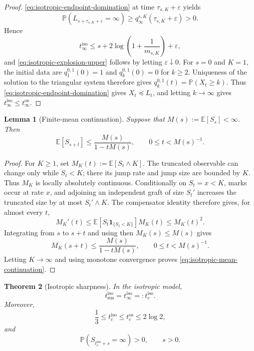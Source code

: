 \documentclass[11pt,a4paper]{amsart}
\newtheorem{theorem}{Theorem}[section]
\newtheorem{lemma}[theorem]{Lemma}
\theoremstyle{remark}
\begin{document}
\begin{proof}
\eqref{eq:isotropic-endpoint-domination} at time
$\tau_{s,K}+\varepsilon$ yields
\[
\mathbb P
(L_{s+\tau_{s,K}+\varepsilon}=\infty)
\geq
q_\infty^{s,K}(\tau_{s,K}+\varepsilon)>0.
\]
Hence
\[
t_{\infty}^{\mathrm{iso}}
\leq
s+2\log\left(1+\frac1{m_{s,K}}\right)+\varepsilon,
\]
and \eqref{eq:isotropic-explosion-upper} follows by letting
$\varepsilon\downarrow0$.
For $s=0$ and $K=1$, the initial data are
$q_1^{0,1}(0)=1$ and $q_k^{0,1}(0)=0$ for $k\geq2$. Uniqueness of the solution to the
triangular system therefore gives
$q_k^{0,1}(t)=\mathbb P(X_t\geq k)$. Thus
\eqref{eq:isotropic-endpoint-domination} gives $X_t\preceq L_t$, and
letting $k\to\infty$ gives
$t_{\infty}^{\mathrm{iso}}\leq t_{\infty}^{\mathrm{os}}$.
\end{proof}



\begin{lemma}[Finite-mean continuation]
\label{lem:isotropic-finite-mean-continuation}
Suppose that $M(s):=\mathbb{E}[S_s]<\infty$. Then
\begin{equation}
\label{eq:isotropic-mean-continuation}
        \mathbb{E}[S_{s+t}]
        \leq
        \frac{M(s)}{1-tM(s)},
        \qquad 0\leq t<M(s)^{-1}.
\end{equation}
\end{lemma}

\begin{proof}
For $K\geq1$, set $M_K(t):=\mathbb{E}[S_t\wedge K]$. The
truncated observable can change only while $S_t<K$; there its jump rate
and jump size are bounded by $K$. Thus $M_K$ is locally absolutely
continuous. Conditionally on $S_t=x<K$, marks occur at rate $x$, and
adjoining an independent graft of size $S_t'$ increases the truncated
size by at most $S_t'\wedge K$. The compensator identity therefore
gives, for almost every $t$,
\[
        M_K'(t)
        \leq
        \mathbb{E}[S_t\mathbf 1_{\{S_t<K\}}]M_K(t)
        \leq M_K(t)^2.
\]
Integrating from $s$ to $s+t$ and using then
$M_K(s)\leq M(s)$ gives
\[
        M_K(s+t)
        \leq
        \frac{M(s)}{1-tM(s)},
        \qquad 0\leq t<M(s)^{-1}.
\]
Letting $K\to\infty$ and using monotone convergence proves
\eqref{eq:isotropic-mean-continuation}.
\end{proof}

\begin{theorem}[Isotropic sharpness]
\label{thm:isotropic-criticality}
In the isotropic model,
\begin{equation}
\label{eq:isotropic-criticality}
        t_{\mathrm{sus}}^{\mathrm{iso}}
        =t_{\infty}^{\mathrm{iso}}
        =:t_c^{\mathrm{iso}}.
\end{equation}
Moreover,
\begin{equation}
\label{eq:isotropic-critical-bounds}
        \frac13
        \leq t_c^{\mathrm{iso}}
        \leq t_c^{\mathrm{os}}
        \leq2\log2,
\end{equation}
and
\[
        \mathbb{P}(S_{t_c^{\mathrm{iso}}+s}=\infty)>0,
        \qquad s>0.
\]
\end{theorem}
\end{document}
